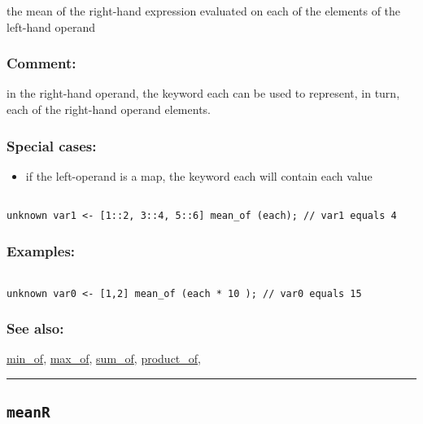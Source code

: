 \documentclass[]{book}
\providecommand{\tightlist}{%
  \setlength{\itemsep}{0pt}\setlength{\parskip}{0pt}}
\theoremstyle{definition}
\theoremstyle{definition}
\theoremstyle{definition}
\theoremstyle{remark}
\begin{document}
the mean of the right-hand expression evaluated on each of the elements
of the left-hand operand

\subsubsection{Comment:}\label{comment-69}

in the right-hand operand, the keyword each can be used to represent, in
turn, each of the right-hand operand elements.

\subsubsection{Special cases:}\label{special-cases-96}

\begin{itemize}
\tightlist
\item
  if the left-operand is a map, the keyword each will contain each value
\end{itemize}

\begin{verbatim}
 
unknown var1 <- [1::2, 3::4, 5::6] mean_of (each); // var1 equals 4
\end{verbatim}

\subsubsection{Examples:}\label{examples-238}

\begin{verbatim}
 
unknown var0 <- [1,2] mean_of (each * 10 ); // var0 equals 15
\end{verbatim}

\subsubsection{See also:}\label{see-also-139}

\href{operators-i-to-m.html\#min_of}{min\_of},
\href{operators-i-to-m.html\#max_of}{max\_of},
\href{operators-s-to-z.html\#sum_of}{sum\_of},
\href{operators-n-to-r.html\#product_of}{product\_of},

\begin{center}\rule{0.5\linewidth}{\linethickness}\end{center}

\subsection{\texorpdfstring{\texttt{meanR}}{meanR}}\label{meanr}
\end{document}
